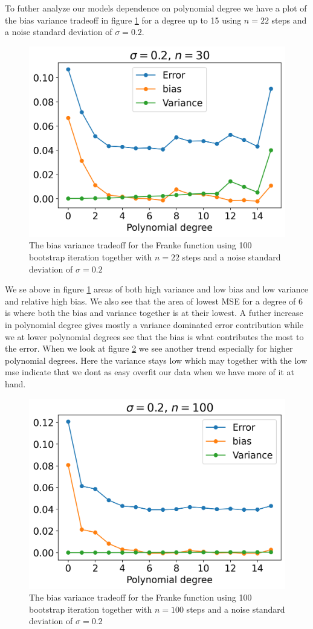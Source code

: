 \documentclass[12pt]{article}
\begin{document}
To futher analyze our models dependence on polynomial degree we have a plot of the bias variance tradeoff in figure \ref{fig:bias_variance} for a degree up to 15 using $n=22$ steps and a noise standard deviation of $\sigma=0.2$.
\begin{figure}[H]
  \centering
  \includegraphics[width=.7\textwidth]{../figures/bias_variance_tradeoff.png}
  \caption{The bias variance tradeoff for the Franke function using 100 bootstrap iteration together with $n=22$ steps and a noise standard deviation of $\sigma=0.2$}
  \label{fig:bias_variance}
\end{figure}
We se above in figure \ref{fig:bias_variance} areas of both high variance and low bias and low variance and relative high bias. We also see that the area of lowest MSE for a degree of 6 is where both the bias and variance together is at their lowest. A futher increase in polynomial degree gives mostly a variance dominated error contribution while we at lower polynomial degrees see that the bias is what contributes the most to the error. When we look at figure \ref{fig:bias_variance_100} we see another trend especially for higher polynomial degrees. Here the variance stays low which may together with the low mse indicate that we dont as easy overfit our data when we have more of it at hand.
\begin{figure}[H]
  \centering
  \includegraphics[width=.7\textwidth]{../figures/bias_variance_100.png}
  \caption{The bias variance tradeoff for the Franke function using 100 bootstrap iteration together with $n=100$ steps and a noise standard deviation of $\sigma=0.2$}
  \label{fig:bias_variance_100}
\end{figure}
\end{document}
